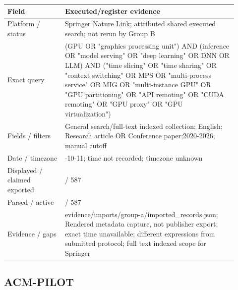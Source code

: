 \documentclass[12pt,a4paper]{article}
\begin{document}
{\small\begin{longtable}{>{\raggedright\arraybackslash}p{0.23\linewidth}>{\raggedright\arraybackslash}p{0.69\linewidth}}
\toprule
Field & Executed/\allowbreak{}register evidence\\\midrule
\endhead
Platform /\allowbreak{} status & Springer Nature Link; attributed shared executed search; not rerun by Group B\\
Exact query & (GPU OR "graphics processing unit") AND (inference OR "model serving" OR "deep learning" OR DNN OR LLM) AND ("time slicing" OR "time sharing" OR "context switching" OR MPS OR "multi-process service" OR MIG OR "multi-instance GPU" OR "GPU partitioning" OR "API remoting" OR "CUDA remoting" OR "GPU proxy" OR "GPU virtualization")\\
Fields /\allowbreak{} filters & General search/\allowbreak{}full-text indexed collection; English; Research article OR Conference paper;2020-2026; manual cutoff\\
Date /\allowbreak{} timezone & 2026-10-11; time not recorded; timezone unknown\\
Displayed /\allowbreak{} claimed exported & 587 /\allowbreak{} 587\\
Parsed /\allowbreak{} active & 587 /\allowbreak{} 587\\
Evidence /\allowbreak{} gaps & evidence/\allowbreak{}imports/\allowbreak{}group-a/\allowbreak{}imported\_\allowbreak{}records.json; Rendered metadata capture, not publisher export; exact time unavailable; different expressions from submitted protocol; full text indexed scope for Springer\\
\bottomrule
\end{longtable}}

\subsection*{ACM-PILOT}
\end{document}
